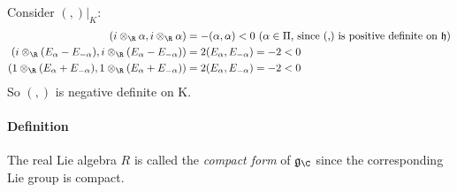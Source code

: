 \documentclass[11pt]{article}
\newcommand{\g}{\ensuremath{\mathfrak{g}}}
\newcommand{\h}{\ensuremath{\mathfrak{h}}}
\begin{document}
Consider $(,)\vert_K$:
\begin{align*}
(i \otimes_{\R} \alpha, i \otimes_{\R} \alpha) &= - (\alpha, \alpha) < 0 \mbox{ ($\alpha \in \Pi$, since (,) is positive definite on $\h$)} \\
(i \otimes_{\R} (E_\alpha - E_{-\alpha}), i \otimes_{\R} (E_\alpha - E_{-\alpha})) &= 2 (E_\alpha, E_{-\alpha}) = -2 < 0 \\
(1 \otimes_{\R} (E_\alpha + E_{-\alpha}), 1 \otimes_{\R} (E_\alpha + E_{-\alpha})) &= 2 (E_\alpha, E_{-\alpha}) = -2 < 0 \\
\end{align*}
So $(,)$ is negative definite on K.

\paragraph{Definition} The real Lie algebra $R$ is called the {\it compact
form} of $\g_{\C}$ since the corresponding Lie group is compact.
\end{document}
